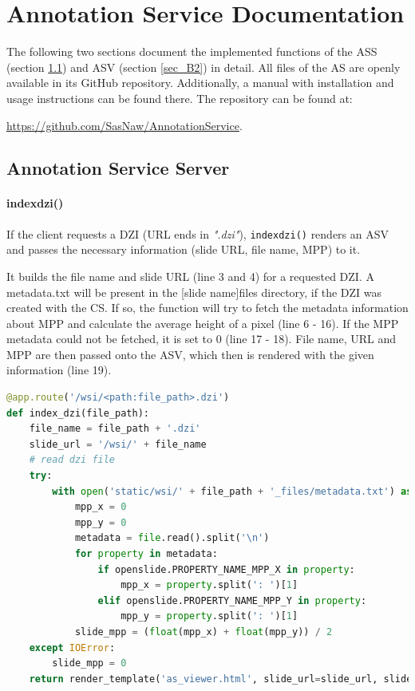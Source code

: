 \chapter{Annotation Service Documentation}

The following two sections document the implemented functions of the ASS (section \ref{sec_B1}) and ASV (section \ref{sec_B2}) in detail. All files of the AS are openly available in its GitHub repository. Additionally, a manual with installation and usage instructions can be found there. The repository can be found at:

 \url{https://github.com/SasNaw/AnnotationService}.

\section{Annotation Service Server}
\label{sec_B1}

\subsubsection{index{\textunderscore}dzi()}
If the client requests a DZI (URL ends in \emph{".dzi"}), \texttt{index{\textunderscore}dzi()} renders an ASV and passes the necessary information (slide URL, file name, MPP) to it.

It builds the file name and slide URL (line 3 and 4) for a requested DZI. A metadata.txt will be present in the [slide name]{\textunderscore}files directory, if the DZI was created with the CS. If so, the function will try to fetch the metadata information about MPP and calculate the average height of a pixel (line 6 - 16). If the MPP metadata could not be fetched, it is set to 0 (line 17 - 18). File name, URL and MPP are then passed onto the ASV, which then is rendered with the given information (line 19).

\begin{lstlisting}[language=Python, frame=single]
@app.route('/wsi/<path:file_path>.dzi')
def index_dzi(file_path):
	file_name = file_path + '.dzi'
	slide_url = '/wsi/' + file_name
	# read dzi file
	try:
		with open('static/wsi/' + file_path + '_files/metadata.txt') as file:
			mpp_x = 0
			mpp_y = 0
			metadata = file.read().split('\n')
			for property in metadata:
				if openslide.PROPERTY_NAME_MPP_X in property:
					mpp_x = property.split(': ')[1]
				elif openslide.PROPERTY_NAME_MPP_Y in property:
					mpp_y = property.split(': ')[1]
			slide_mpp = (float(mpp_x) + float(mpp_y)) / 2
	except IOError:
		slide_mpp = 0
	return render_template('as_viewer.html', slide_url=slide_url, slide_mpp=slide_mpp, file_name=file_name)
\end{lstlisting}


